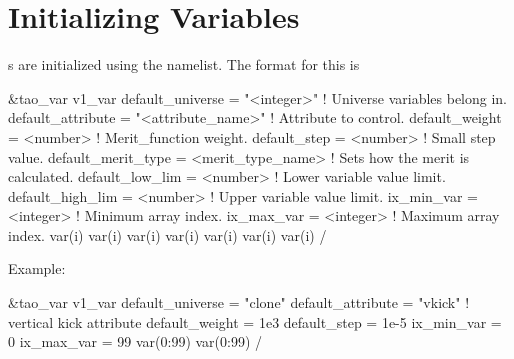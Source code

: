 \section{Initializing Variables}
\label{s:init_var} 

s are initialized using the  namelist. The
format for this is
\begin{example}
  \&tao_var
    v1_var%
    default_universe   = "<integer>"         ! Universe variables belong in.
    default_attribute  = "<attribute_name>"  ! Attribute to control.
    default_weight     = <number>            ! Merit_function weight.
    default_step       = <number>            ! Small step value.
    default_merit_type = <merit_type_name>   ! Sets how the merit is calculated.
    default_low_lim    = <number>            ! Lower variable value limit. 
    default_high_lim   = <number>            ! Upper variable value limit. 
    ix_min_var         = <integer>           ! Minimum array index.
    ix_max_var         = <integer>           ! Maximum array index.
    var(i)%
    var(i)%
    var(i)%
    var(i)%
    var(i)%
    var(i)%
    var(i)%
  /
\end{example}
Example:
\begin{example}
  \&tao_var
    v1_var%
    default_universe  = "clone"
    default_attribute = "vkick"     ! vertical kick attribute
    default_weight    = 1e3
    default_step      = 1e-5
    ix_min_var        = 0
    ix_max_var        = 99
    var(0:99)%
    var(0:99)%
  /
\end{example}

